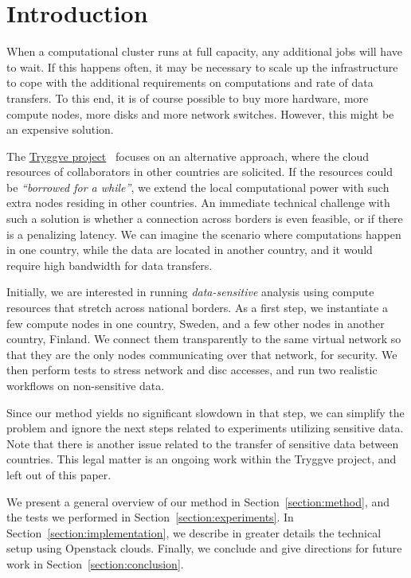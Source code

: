 \section{Introduction}
\label{section:intro}

When a computational cluster runs at full capacity, any additional jobs will
have to wait. If this happens often, it may be necessary to scale up
the infrastructure to cope with the additional requirements on computations and rate of data transfers. To
this end, it is of course possible to buy more hardware, \ie more
compute nodes, more disks and more network switches. However, this
might be an expensive solution.

The \href{https://wiki.neic.no/wiki/Tryggve}{Tryggve
  project}~\cite{tryggve} focuses on an alternative
approach, where the cloud resources of collaborators in other countries are solicited.
%
If the resources could be \emph{``borrowed for a while''}, we extend the local
computational power with such extra nodes residing in other countries.
%
An immediate technical challenge with such a solution is whether a
connection across borders is even feasible, or if there is a
penalizing latency. We can imagine the scenario where computations
happen in one country, while the data are located in another country,
and it would require high bandwidth for data transfers.

Initially, we are interested in running \emph{data-sensitive}
analysis using compute resources that stretch across national borders.
%
As a first step, we instantiate a few compute nodes in one country,
Sweden, and a few other nodes in another country, Finland. We
connect them transparently to the same virtual network so that they are
the only nodes communicating over that network, for security. We then
perform tests to stress network and disc accesses, and run two
realistic workflows on non-sensitive data.

Since our method yields no significant slowdown in that step, we
can simplify the problem and ignore the next steps related to
experiments utilizing sensitive data.
%
Note that there is another issue related to the transfer of sensitive
data between countries. This legal matter is an ongoing work within
the Tryggve project, and left out of this paper.

We present a general overview of our method in
Section~\ref{section:method}, and the tests we performed in
Section~\ref{section:experiments}.
%
In Section~\ref{section:implementation}, we describe in greater
details the technical setup using Openstack clouds.
%
Finally, we conclude and give directions for future work in
Section~\ref{section:conclusion}.
